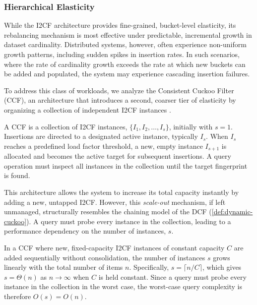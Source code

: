 \subsubsection{Hierarchical Elasticity}

While the I2CF architecture provides fine-grained, bucket-level elasticity, its rebalancing mechanism is most effective under predictable, incremental growth in dataset cardinality. Distributed systems, however, often experience non-uniform growth patterns, including sudden spikes in insertion rates. In such scenarios, where the rate of cardinality growth exceeds the rate at which new buckets can be added and populated, the system may experience cascading insertion failures.

To address this class of workloads, we analyze the Consistent Cuckoo Filter (CCF), an architecture that introduces a second, coarser tier of elasticity by organizing a collection of independent I2CF instances \cite{Luo2021ACC}.

\begin{definition}
    A CCF is a collection of I2CF instances, $\{I_1, I_2, \ldots, I_s\}$, initially with $s=1$. Insertions are directed to a designated active instance, typically $I_s$. When $I_s$ reaches a predefined load factor threshold, a new, empty instance $I_{s+1}$ is allocated and becomes the active target for subsequent insertions. A query operation must inspect all instances in the collection until the target fingerprint is found.
\end{definition}

This architecture allows the system to increase its total capacity instantly by adding a new, untapped I2CF. However, this \emph{scale-out} mechanism, if left unmanaged, structurally resembles the chaining model of the DCF (\ref{def:dynamic-cuckoo}). A query must probe every instance in the collection, leading to a performance dependency on the number of instances, $s$.

\begin{proposition}
    In a CCF where new, fixed-capacity I2CF instances of constant capacity $C$ are added sequentially without consolidation, the number of instances $s$ grows linearly with the total number of items $n$. Specifically, $s = \lceil n/C \rceil$, which gives $s = \Theta(n)$ as $n \to \infty$ when $C$ is held constant. Since a query must probe every instance in the collection in the worst case, the worst-case query complexity is therefore $O(s) = O(n)$.
\end{proposition}

